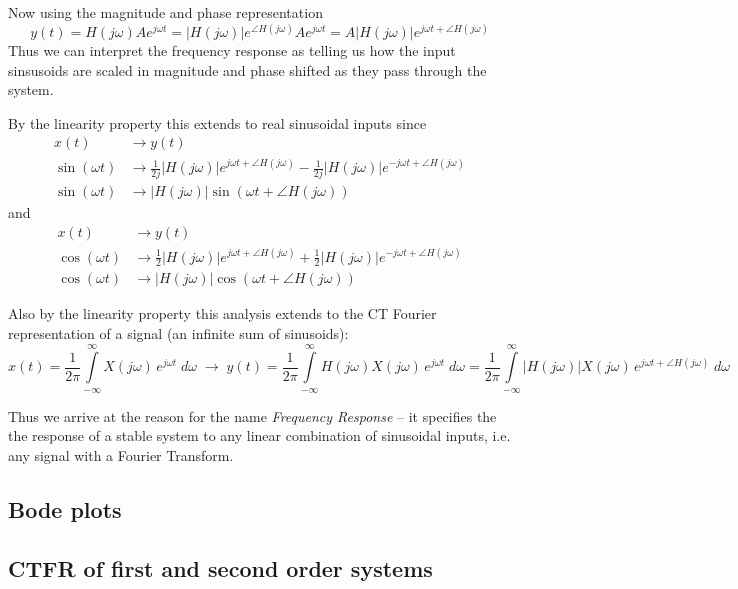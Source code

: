 Now using the magnitude and phase representation
\[
y(t) = H(j\omega) A e^{j\omega t} = |H(j\omega)|e^{\angle H(j\omega)} A e^{j\omega t} = A |H(j\omega)| e^{j\omega t + \angle H(j\omega)} 
\]
Thus we can interpret the frequency response as telling us how the input sinsusoids are scaled in magnitude and phase shifted as they pass through the system.

By the linearity property this extends to real sinusoidal inputs since
\begin{align*}
  x(t) &\longrightarrow y(t)\\
  \sin(\omega t) &\longrightarrow \frac{1}{2j}|H(j\omega)| e^{j\omega t + \angle H(j\omega)} - \frac{1}{2j}|H(j\omega)| e^{-j\omega t + \angle H(j\omega)}\\
  \sin(\omega t) &\longrightarrow |H(j\omega)|\sin(\omega t + \angle H(j\omega))  
\end{align*}
and
\begin{align*}
  x(t) &\longrightarrow y(t)\\
  \cos(\omega t) &\longrightarrow \frac{1}{2}|H(j\omega)| e^{j\omega t + \angle H(j\omega)} + \frac{1}{2}|H(j\omega)| e^{-j\omega t + \angle H(j\omega)}\\
  \cos(\omega t) &\longrightarrow |H(j\omega)|\cos(\omega t + \angle H(j\omega))  
\end{align*}

Also by the linearity property this analysis extends to the CT Fourier representation of a signal (an infinite sum of sinusoids):
\[
x(t) = \frac{1}{2\pi}\int\limits_{-\infty}^{\infty} X(j \omega) \, e^{j \omega t}\; d\omega \;\longrightarrow\; y(t) = \frac{1}{2\pi}\int\limits_{-\infty}^{\infty} H(j \omega) X(j \omega) \, e^{j \omega t}\; d\omega = \frac{1}{2\pi}\int\limits_{-\infty}^{\infty} \left| H(j \omega)\right| X(j \omega) \, e^{j \omega t + \angle H(j \omega)}\; d\omega
\]

Thus we arrive at the reason for the name \textit{Frequency Response} -- it specifies the the response of a stable system to any linear combination of sinusoidal inputs, i.e. any signal with a Fourier Transform.

\subsection{Bode plots}
\subsection{CTFR of first and second order systems}
